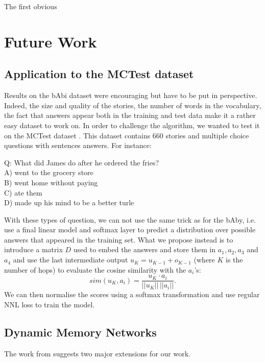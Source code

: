 \documentclass[twoside,11pt]{article}
\begin{document}
The first obvious 
\section{Future Work}
\subsection{Application to the MCTest dataset}
Results on the bAbi dataset were encouraging but have to be put in perspective. Indeed, the size and quality of the stories, the number of words in the vocabulary, the fact that answers appear both in the training and test data make it a rather easy dataset to work on. In order to challenge the algorithm, we wanted to test it on the MCTest dataset \cite{mctest}. This dataset contains 660 stories and multiple choice questions with sentences answers. For instance:
\begin{framed}
\begin{center}
Q:  What did James do after he ordered the fries?\\
A) went to the grocery store\\
B) went home without paying\\
C) ate them\\
D) made up his mind to be a better turle\\
\end{center}
\end{framed}
\noindent With these types of question, we can not use the same trick as for the bAby, i.e. use a final linear model and softmax layer to predict a distribution over possible answers that appeared in the training set. What we propose instead is to introduce a matrix $D$ used to embed the answers and store them in $a_1, a_2, a_3$ and $a_4$ and use the last intermediate output $u_K = u_{K-1} + o_{K-1}$ (where $K$ is the number of hops) to evaluate the cosine similarity with the $a_i$'s:
$$sim(u_K,a_i) = \frac{u_K \cdot a_i}{||u_K||\,||a_i||}.$$ We can then normalise the scores using a softmax transformation and use regular NNL loss to train the model.

\subsection{Dynamic Memory Networks}

The work from \cite{dmn} suggests two major extensions for our work. 
\end{document}
